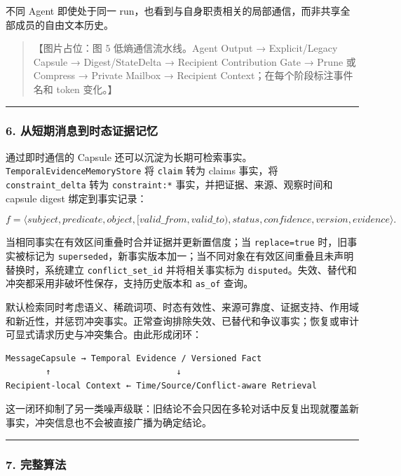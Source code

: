 \documentclass[UTF8,a4paper,12pt]{ctexart}
\begin{document}
不同 Agent 即使处于同一 run，也看到与自身职责相关的局部通信，而非共享全部成员的自由文本历史。

\begin{quote}
【图片占位：图 5 低熵通信流水线。Agent Output → Explicit/Legacy Capsule → Digest/StateDelta → Recipient Contribution Gate → Prune 或 Compress → Private Mailbox → Recipient Context；在每个阶段标注事件名和 token 变化。】
\end{quote}

\begin{center}\rule{0.5\linewidth}{0.5pt}\end{center}

\subsubsection{6. 从短期消息到时态证据记忆}

通过即时通信的 Capsule 还可以沉淀为长期可检索事实。\texttt{TemporalEvidenceMemoryStore} 将 \texttt{claim} 转为 claims 事实，将 \texttt{constraint\_delta} 转为 \texttt{constraint:*} 事实，并把证据、来源、观察时间和 capsule digest 绑定到事实记录：

\[
f=\langle subject,predicate,object,[valid\_from,valid\_to),status,
confidence,version,evidence\rangle.
\]

当相同事实在有效区间重叠时合并证据并更新置信度；当 \texttt{replace=true} 时，旧事实被标记为 \texttt{superseded}，新事实版本加一；当不同对象在有效区间重叠且未声明替换时，系统建立 \texttt{conflict\_set\_id} 并将相关事实标为 \texttt{disputed}。失效、替代和冲突都采用非破坏性保存，支持历史版本和 \texttt{as\_of} 查询。

默认检索同时考虑语义、稀疏词项、时态有效性、来源可靠度、证据支持、作用域和新近性，并惩罚冲突事实。正常查询排除失效、已替代和争议事实；恢复或审计可显式请求历史与冲突集合。由此形成闭环：

\begin{verbatim}
MessageCapsule → Temporal Evidence / Versioned Fact
        ↑                         ↓
Recipient-local Context ← Time/Source/Conflict-aware Retrieval
\end{verbatim}

这一闭环抑制了另一类噪声级联：旧结论不会只因在多轮对话中反复出现就覆盖新事实，冲突信息也不会被直接广播为确定结论。

\begin{center}\rule{0.5\linewidth}{0.5pt}\end{center}

\subsubsection{7. 完整算法}
\end{document}
